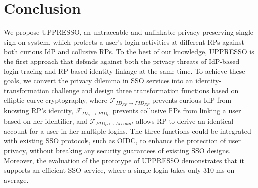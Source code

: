 \section{Conclusion}
\label{sec:conclusion}
We propose UPPRESSO, an untraceable and unlinkable privacy-preserving single sign-on system,
 which protects a user's login activities at different RPs against both curious IdP and collusive RPs.
To the best of our knowledge,
 UPPRESSO is the first approach that defends against both the privacy threats of IdP-based login tracing and RP-based identity linkage at the same time.
To achieve these goals, we convert the privacy dilemma in SSO services into an identity-transformation challenge
 and design three transformation functions based on elliptic curve cryptography,
 where $\mathcal{F}_{ID_{RP} \mapsto PID_{RP}}$ prevents curious IdP from knowing RP's identity,
 $\mathcal{F}_{ID_{U} \mapsto PID_{U}}$ prevents collusive RPs from linking a user based on her identifier,
 and $\mathcal{F}_{PID_{U} \mapsto Account}$ allows RP to derive an identical account for a user in her multiple logins.
The three functions could be integrated with existing SSO protocols,
    such as OIDC,
    to enhance the protection of user privacy,
    without breaking any security guarantees of existing SSO designs.
Moreover, the evaluation of the prototype of UPPRESSO demonstrates
 that it supports an efficient SSO service, where a single login takes only 310 ms on average.
